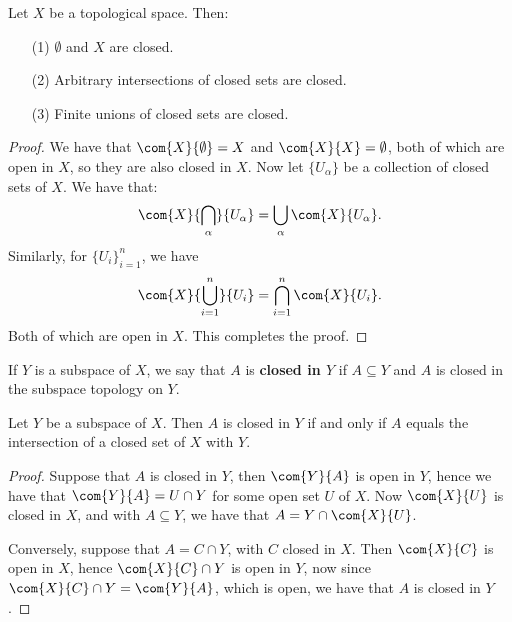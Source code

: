\begin{theorem}\label{1.6.1}
    Let $X$ be a topological space. Then:
         \begin{enumerate}
             \item[(1)] $\emptyset$ and  $X$ are closed.

             \item[(2)] Arbitrary intersections of closed sets are closed.

             \item[(3)] Finite unions of closed sets are closed.
        \end{enumerate}
\end{theorem}
\begin{proof}
    We have that $\com{X}{\emptyset}=X$ and  $\com{X}{X}=\emptyset$, both of
    which are open in  $X$, so they are also closed in  $X$. Now let
    $\{U_{\alpha}\}$ be a collection of closed sets of  $X$. We have that:
        \begin{equation*}
            \com{X}{\bigcap_{\alpha}}{U_{\alpha}}=\bigcup_{\alpha}{\com{X}{U_{\alpha}}}.
        \end{equation*}
        Similarly, for $\{U_i\}_{i=1}^{n}$, we have
        \begin{equation*}
            \com{X}{\bigcup_{i=1}^{n}}{U_{i}}=\bigcap_{i=1}^{n}{\com{X}{U_{i}}}.
        \end{equation*}
    Both of which are open in $X$. This completes the proof.
\end{proof}

\begin{definition}
    If $Y$ is a subspace of  $X$, we say that  $A$ is  \textbf{closed in $Y$} if
    $A \subseteq Y$ and  $A$ is closed in the subspace topology on  $Y$.
\end{definition}

\begin{theorem}\label{1.6.2}
    Let $Y$ be a subspace of  $X$. Then  $A$ is closed in  $Y$ if and only if
    $A$ equals the intersection of a closed set of  $X$ with  $Y$.
\end{theorem}
\begin{proof}
    Suppose that $A$ is closed in  $Y$, then  $\com{Y}{A}$ is open in  $Y$,
    hence we have that  $\com{Y}{A}=U \cap Y$ for some open set $U$ of  $X$. Now
    $\com{X}{U}$ is closed in  $X$, and with  $A \subseteq Y$, we have that
    $A=Y \cap \com{X}{U}$.

    Conversely, suppose that $A=C \cap Y$, with  $C$ closed in  $X$. Then
    $\com{X}{C}$ is open in  $X$, hence  $\com{X}{C} \cap Y$ is open in  $Y$,
    now since  $\com{X}{C} \cap Y=\com{Y}{A}$, which is open, we have that  $A$
    is closed in  $Y$.
\end{proof}

